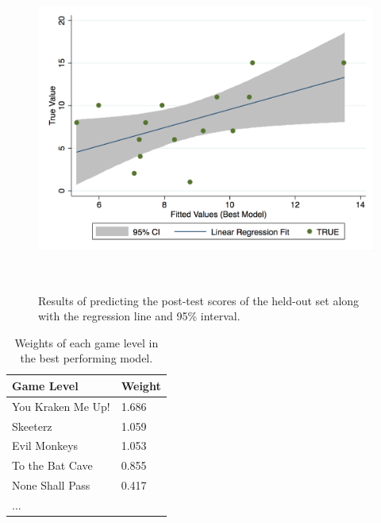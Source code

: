 \documentclass{sigchi}
\begin{document}
		
		
	\begin{figure}
		\centering
		\includegraphics[width=0.9\columnwidth]{figures/regression.png}
		\caption{Results of predicting the post-test scores of the held-out set along with the regression line and 95\% interval.}~\label{fig:regression}
	\end{figure}
	
	\begin{table}[ht]
		\centering
		\begin{tabular}{ll}
			\hline
			\textbf{Game Level} & \textbf{Weight} \\ \hline
			You Kraken Me Up!   & 1.686                               \\
			Skeeterz            & 1.059                               \\
			Evil Monkeys        & 1.053                               \\
			To the Bat Cave     & 0.855                               \\
			None Shall Pass     & 0.417                               \\
			...                 &                                    
		\end{tabular}
		\caption{Weights of each game level in the best performing model.}
		\label{tab:regrweights}	
	\end{table}
		
		 
		
\end{document}
